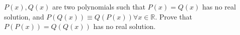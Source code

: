 $P(x),Q(x)$ are two polynomials such that $P(x)=Q(x)$ has no real solution, and $P(Q(x))\equiv Q(P(x))\forall x\in\mathbb{R}$. Prove that $P(P(x))=Q(Q(x))$ has no real solution.